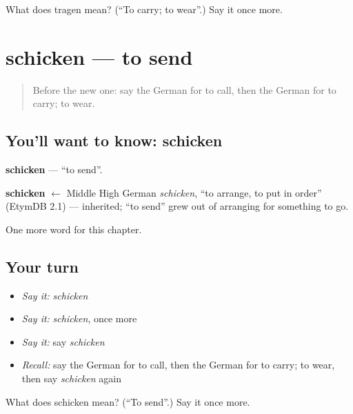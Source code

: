\begin{tcolorbox}[breakable,colback=teal!4,colframe=teal!35!black,title={Before you move on}]
What does tragen mean? (\textquotedblleft{}To carry; to wear\textquotedblright{}.) Say it once more.
\end{tcolorbox}
\section[schicken]{schicken — to send}

\label{lesson:GE-C68-schicken}



\begin{quote}
Before the new one: say the German for to call, then the German for to carry; to wear.
\end{quote}

\subsection*{You'll want to know: schicken}
\textbf{schicken} — \textquotedblleft{}to send\textquotedblright{}.

\begin{cousinweb}
\textbf{schicken} $\leftarrow$ Middle High German \emph{schicken}, \textquotedblleft{}to arrange, to put in order\textquotedblright{} (EtymDB 2.1) — inherited; \textquotedblleft{}to send\textquotedblright{} grew out of arranging for something to go.
\end{cousinweb}

\begin{grammarlens}[title={What you've built}]
One more word for this chapter.
\end{grammarlens}

\subsection*{Your turn}
\begin{itemize}
\raggedright
  \item \emph{Say it:} \emph{schicken}
  \item \emph{Say it:} \emph{schicken}, once more
  \item \emph{Say it:} say \emph{schicken}
  \item \emph{Recall:} say the German for to call, then the German for to carry; to wear, then say \emph{schicken} again
\end{itemize}

\begin{tcolorbox}[breakable,colback=teal!4,colframe=teal!35!black,title={Before you move on}]
What does schicken mean? (\textquotedblleft{}To send\textquotedblright{}.) Say it once more.
\end{tcolorbox}
